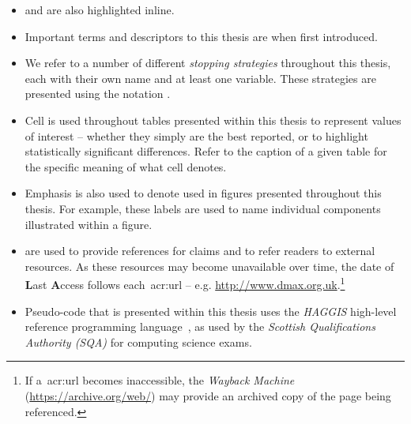 \begin{preamble}
\begin{itemize}
\begin{itemize}
        \item{ and  are also highlighted inline.}
        
        \item{Important terms and descriptors to this thesis are  when first introduced.}
        
        \item{We refer to a number of different \emph{stopping strategies} throughout this thesis, each with their own name and at least one variable. These strategies are presented using the notation .}
        
        \item{Cell  is used throughout tables presented within this thesis to represent values of interest -- whether they simply are the best reported, or to highlight statistically significant differences. Refer to the caption of a given table for the specific meaning of what cell  denotes.}
        
        \item{Emphasis is also used to denote  used in figures presented throughout this thesis. For example, these labels are used to name individual components illustrated within a figure.}
        
    \end{itemize}
\end{itemize}

\noindent{}\vspace*{-4mm}
\begin{itemize}
    \item{ are used to provide references for claims and to refer readers to external resources. As these resources may become unavailable over time, the date of \textbf{L}ast \textbf{A}ccess follows each~\gls{acr:url} -- e.g. \url{http://www.dmax.org.uk}.\footnote{If a~\gls{acr:url} becomes inaccessible, the \emph{Wayback Machine} (\url{https://archive.org/web/}) may provide an archived copy of the page being referenced.}}
\end{itemize}

\noindent{}
\begin{itemize}
    \item{Pseudo-code that is presented within this thesis uses the \emph{HAGGIS} high-level reference programming language~\citep{cutts2014haggis}, as used by the \emph{Scottish Qualifications Authority (SQA)} for computing science exams.}
    

\end{itemize}
\end{preamble}
